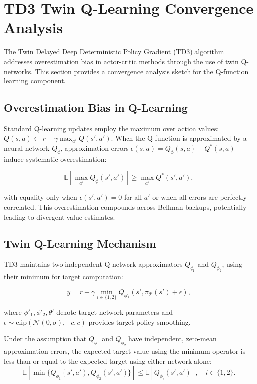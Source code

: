 \section{TD3 Twin Q-Learning Convergence Analysis}
\label{sec:td3_convergence}

The Twin Delayed Deep Deterministic Policy Gradient (TD3) algorithm addresses overestimation bias in actor-critic methods through the use of twin Q-networks. This section provides a convergence analysis sketch for the Q-function learning component.

\subsection{Overestimation Bias in Q-Learning}

Standard Q-learning updates employ the maximum over action values: $Q(s, a) \leftarrow r + \gamma \max_{a'} Q(s', a')$. When the Q-function is approximated by a neural network $Q_\phi$, approximation errors $\epsilon(s, a) = Q_\phi(s, a) - Q^*(s, a)$ induce systematic overestimation:

\begin{equation}
\mathbb{E}\left[\max_{a'} Q_\phi(s', a')\right] \geq \max_{a'} Q^*(s', a'),
\end{equation}

with equality only when $\epsilon(s', a') = 0$ for all $a'$ or when all errors are perfectly correlated. This overestimation compounds across Bellman backups, potentially leading to divergent value estimates.

\subsection{Twin Q-Learning Mechanism}

TD3 maintains two independent Q-network approximators $Q_{\phi_1}$ and $Q_{\phi_2}$, using their minimum for target computation:

\begin{equation}
y = r + \gamma \min_{i \in \{1, 2\}} Q_{\phi'_i}(s', \pi_{\theta'}(s') + \epsilon),
\end{equation}

where $\phi'_1, \phi'_2, \theta'$ denote target network parameters and $\epsilon \sim \text{clip}(\mathcal{N}(0, \sigma), -c, c)$ provides target policy smoothing.

\begin{proposition}
\label{prop:td3_bias}
Under the assumption that $Q_{\phi_1}$ and $Q_{\phi_2}$ have independent, zero-mean approximation errors, the expected target value using the minimum operator is less than or equal to the expected target using either network alone:
\begin{equation}
\mathbb{E}\left[\min\{Q_{\phi_1}(s', a'), Q_{\phi_2}(s', a')\}\right] \leq \mathbb{E}\left[Q_{\phi_i}(s', a')\right], \quad i \in \{1, 2\}.
\end{equation}
\end{proposition}

